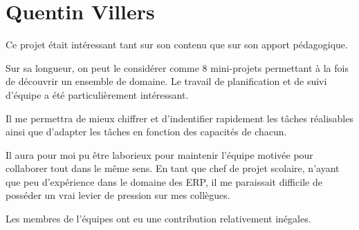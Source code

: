 \section{Quentin Villers}

Ce projet était intéressant tant sur son contenu que sur son apport pédagogique. 

Sur sa longueur, on peut le considérer comme 8 mini-projets permettant à la fois de découvrir 
un ensemble de domaine. Le travail de planification et de suivi d'équipe a été particulièrement intéressant.

Il me permettra de mieux chiffrer et d'indentifier rapidement les tâches réalisables ainsi 
que d'adapter les tâches en fonction des capacités de chacun. 

Il aura pour moi pu être laborieux pour maintenir l'équipe motivée pour collaborer 
tout dans le même sens. En tant que chef de projet scolaire, n'ayant que peu d'expérience
dans le domaine des ERP, il me paraissait difficile de posséder un vrai levier de pression 
sur mes collègues.

Les membres de l'équipes ont eu une contribution relativement inégales.
